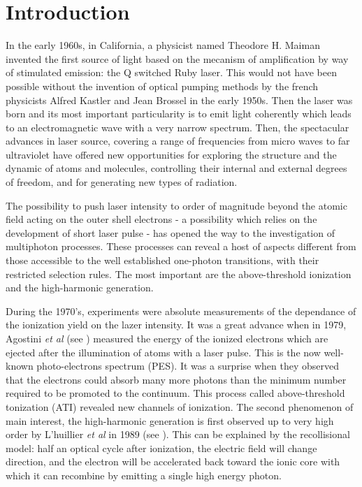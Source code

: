 \documentclass[a4paper]{article}
\begin{document}
\newpage
\unboldmath{\tableofcontents}
\newpage


\section{Introduction}

In the early 1960s, in California, a physicist named Theodore H. Maiman invented the first source of light based on the mecanism of amplification by way of stimulated emission: the Q switched Ruby laser. This would not have been possible without the invention of optical pumping methods by the french physicists Alfred Kastler and Jean Brossel in the early 1950s. Then the laser was born and its most important particularity is to emit light coherently which leads to an electromagnetic wave with a very narrow spectrum.
Then, the spectacular advances in laser source, covering a range of frequencies from micro waves to far ultraviolet have offered new opportunities for exploring the structure and the dynamic of atoms and molecules, controlling their internal and external degrees of freedom, and for generating new types of radiation. 
\par
The possibility to push laser intensity to order of magnitude beyond the atomic field acting on the outer shell electrons - a possibility which relies on the development of short laser pulse - has opened the way to the investigation of multiphoton processes. These processes can reveal a host of aspects different from those accessible to the well established one-photon transitions, with their restricted selection rules.
The most important are the above-threshold ionization and the high-harmonic generation.
\par
During the 1970's, experiments were absolute measurements of the dependance of the ionization yield on the lazer intensity.
It was a great advance when in 1979, Agostini \textit{et al} (see \cite{Agostini_1979}) measured the energy of the ionized electrons which are ejected after the illumination of atoms with a laser pulse. This is the now well-known photo-electrons spectrum (PES). It was a surprise when they observed that the electrons could absorb many more photons than the minimum number required to be promoted to the continuum. This process called above-threshold tonization (ATI) revealed new channels of ionization.
The second phenomenon of main interest, the high-harmonic generation is first observed up to very high order by L'huillier \textit{et al} in 1989 (see \cite{Li_1989}). This can be explained by the recollisional model: half an optical cycle after ionization, the electric field will change direction, and the electron will be accelerated back toward the ionic core with which it can recombine by emitting a single high energy photon. 
\end{document}
